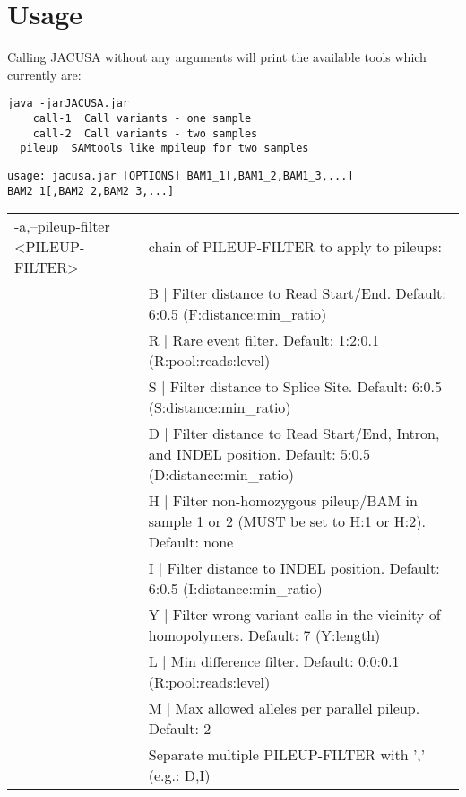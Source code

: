 \documentclass[10pt, a4paper]{article}
\begin{document}
\section{Usage}
Calling JACUSA without any arguments will print the available tools which currently are:
\begin{verbatim}
java -jarJACUSA.jar
	call-1  Call variants - one sample
	call-2  Call variants - two samples
  pileup  SAMtools like mpileup for two samples
\end{verbatim}
{\small
\begin{verbatim}
usage: jacusa.jar [OPTIONS] BAM1_1[,BAM1_2,BAM1_3,...] BAM2_1[,BAM2_2,BAM2_3,...]
\end{verbatim}}
\begin{center}
{\small
\begin{longtable}{p{}p{}}
 -a,--pileup-filter <PILEUP-FILTER>             & chain of PILEUP-FILTER to apply to pileups: \\
                                                & B | Filter distance to Read Start/End. Default: 6:0.5 (F:distance:min\_ratio) \\
                                                & R | Rare event filter. Default: 1:2:0.1 (R:pool:reads:level) \\
                                                & S | Filter distance to Splice Site. Default: 6:0.5 (S:distance:min\_ratio) \\
                                                & D | Filter distance to Read Start/End, Intron, and INDEL position. Default: 5:0.5 (D:distance:min\_ratio) \\
                                                & H | Filter non-homozygous pileup/BAM in sample 1 or 2 (MUST be set to H:1 or H:2). Default: none \\
                                                & I | Filter distance to INDEL position. Default: 6:0.5 (I:distance:min\_ratio) \\
                                                & Y | Filter wrong variant calls in the vicinity of homopolymers. Default: 7 (Y:length) \\
                                                & L | Min difference filter. Default: 0:0:0.1 (R:pool:reads:level) \\
                                                & M | Max allowed alleles per parallel pileup. Default: 2 \\
                                                & Separate multiple PILEUP-FILTER with ',' (e.g.: D,I) \\

\end{longtable}}
\end{center}
\end{document}
